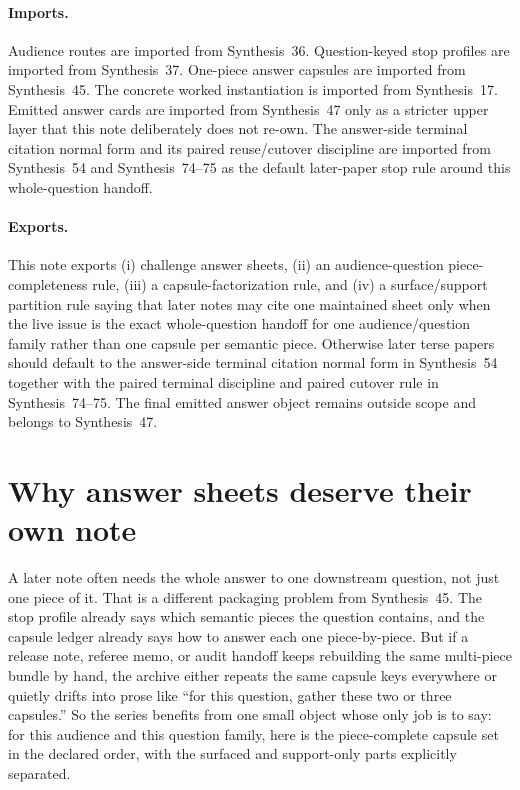 \documentclass[11pt]{article}
\begin{document}
\paragraph{Imports.}
Audience routes are imported from Synthesis~36.\cite{series:challengeroutes}
Question-keyed stop profiles are imported from Synthesis~37.\cite{series:challengestops}
One-piece answer capsules are imported from Synthesis~45.\cite{series:challengeanswercapsules}
The concrete worked instantiation is imported from Synthesis~17.\cite{series:workedexample}
Emitted answer cards are imported from Synthesis~47 only as a stricter upper layer that this note deliberately does not re-own.\cite{series:challengeanswercards}
The answer-side terminal citation normal form and its paired reuse/cutover discipline are imported from Synthesis~54 and Synthesis~74--75 as the default later-paper stop rule around this whole-question handoff.\cite{series:challengeanswerreviewmenus,series:pairedterminalcitationdiscipline,series:pairedterminalcutoverrules}

\paragraph{Exports.}
This note exports (i) challenge answer sheets, (ii) an audience-question piece-completeness rule, (iii) a capsule-factorization rule, and (iv) a surface/support partition rule saying that later notes may cite one maintained sheet only when the live issue is the exact whole-question handoff for one audience/question family rather than one capsule per semantic piece.
Otherwise later terse papers should default to the answer-side terminal citation normal form in Synthesis~54 together with the paired terminal discipline and paired cutover rule in Synthesis~74--75. The final emitted answer object remains outside scope and belongs to Synthesis~47.\cite{series:challengeanswercards,series:challengeanswerreviewmenus,series:pairedterminalcitationdiscipline,series:pairedterminalcutoverrules}

\section{Why answer sheets deserve their own note}
A later note often needs the whole answer to one downstream question, not just one piece of it.
That is a different packaging problem from Synthesis~45.
The stop profile already says which semantic pieces the question contains, and the capsule ledger already says how to answer each one piece-by-piece.
But if a release note, referee memo, or audit handoff keeps rebuilding the same multi-piece bundle by hand, the archive either repeats the same capsule keys everywhere or quietly drifts into prose like ``for this question, gather these two or three capsules.''
So the series benefits from one small object whose only job is to say: for this audience and this question family, here is the piece-complete capsule set in the declared order, with the surfaced and support-only parts explicitly separated.
\end{document}
